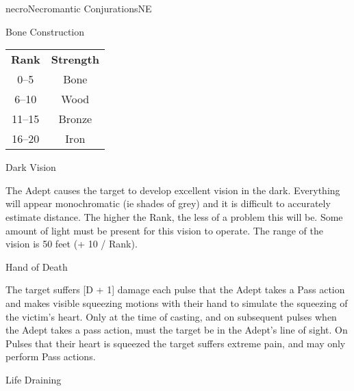 \begin{college}[1.1]{necro}{Necromantic Conjurations}{NE}
\begin{spell}[S-4]{Bone Construction}
\begin{effects}
\begin{tabular}{cc}
\textbf{Rank} & \textbf{Strength} \\
0--5	& Bone \\
6--10	& Wood \\
11--15	& Bronze \\
16--20	& Iron \\
\end{tabular}
\end{effects}
\end{spell}

\begin{spell}[S-5]{Dark Vision}

\begin{effects}
The Adept causes the target to develop excellent vision in the dark.
Everything will appear monochromatic (ie shades of grey) and it is
difficult to accurately estimate distance.  The higher the Rank, the
less of a problem this will be.  Some amount of light must be present
for this vision to operate.  The range of the vision is 50 feet (+ 10
/ Rank).
\end{effects}
\end{spell}

\begin{spell}[S-6]{Hand of Death}

\begin{effects}
The target suffers [D + 1] damage each pulse that the Adept takes a
Pass action and makes visible squeezing motions with their hand to
simulate the squeezing of the victim's heart.  Only at the time of
casting, and on subsequent pulses when the Adept takes a pass action,
must the target be in the Adept's line of sight.  On Pulses that their
heart is squeezed the target suffers extreme pain, and may only
perform Pass actions.
\end{effects}
\end{spell}

\begin{spell}[S-7]{Life Draining}


\end{spell}
\end{college}
